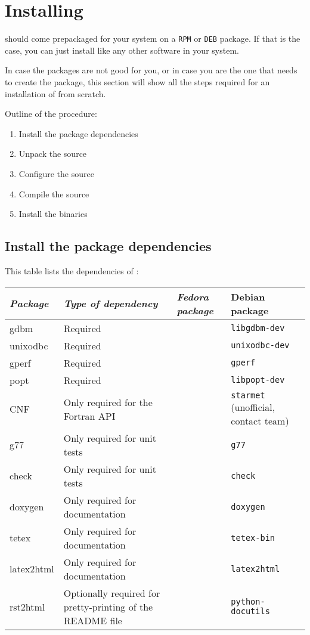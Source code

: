 \section {Installing \dballe{} }

\dballe{} should come prepackaged for your system on a {\tt RPM} or {\tt DEB}
package.  If that is the case, you can just install \dballe{} like any other
software in your system.

In case the packages are not good for you, or in case you are the one that
needs to create the package, this section will show all the steps required for
an installation of \dballe{} from scratch.

Outline of the procedure:

\begin{enumerate}
\item Install the package dependencies
\item Unpack the source
\item Configure the source
\item Compile the source
\item Install the binaries
\end{enumerate}

\subsection{Install the package dependencies}

This table lists the dependencies of \dballe{}:

\begin{tabular}{|l|l|l|l|}
\hline
{\em Package} & {\em Type of dependency} & {\em Fedora package} & {\rm Debian package} \\
\hline
gdbm	   & Required			     & {\tt } & {\tt libgdbm-dev} \\
unixodbc   & Required                        & {\tt } & {\tt unixodbc-dev} \\
gperf      & Required                        & {\tt } & {\tt gperf} \\
popt       & Required                        & {\tt } & {\tt libpopt-dev} \\
CNF        & Only required for the Fortran API & {\tt } & {\tt starmet} (unofficial, contact \dballe{} team) \\
g77        & Only required for unit tests    & {\tt } & {\tt g77} \\
check	   & Only required for unit tests    & {\tt } & {\tt check} \\
doxygen	   & Only required for documentation & {\tt } & {\tt doxygen} \\
tetex      & Only required for documentation & {\tt } & {\tt tetex-bin} \\
latex2html & Only required for documentation & {\tt } & {\tt latex2html} \\
rst2html   & Optionally required for pretty-printing of the README file & {\tt } & {\tt python-docutils} \\
\end{tabular}


